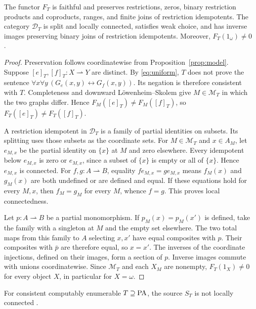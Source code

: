 \begin{theorem}\label{thm:faithful}
The functor $F_T$ is faithful and preserves restrictions, zeros, binary
restriction products and coproducts, ranges, and finite joins of
restriction idempotents. The category
$\mathcal D_T$ is split and locally connected, satisfies weak choice,
and has inverse images preserving binary joins of restriction
idempotents. Moreover,
$F_T(1_\omega)\ne0$.
\end{theorem}
\begin{proof}
Preservation follows coordinatewise from Proposition~\ref{prop:model}.
Suppose $[e]_T,[f]_T:X\rightharpoonup Y$ are distinct. By
\eqref{eq:uniform}, $T$ does not prove the sentence
$\forall x\forall y\,(G_e(x,y)\leftrightarrow G_f(x,y))$.
Its negation is therefore consistent with $T$.
Completeness and downward L\"owenheim--Skolem give
$M\in\mathcal M_T$ in which the two graphs differ. Hence
$F_M([e]_T)\ne F_M([f]_T)$, so $F_T([e]_T)\ne F_T([f]_T)$.

A restriction idempotent in $\mathcal D_T$ is a family of partial
identities on subsets. Its splitting uses those subsets as the
coordinate sets. For $M\in\mathcal M_T$ and $x\in A_M$, let $e_{M,x}$ be the
partial identity on $\{x\}$ at $M$ and zero elsewhere.
Every idempotent below $e_{M,x}$ is zero or $e_{M,x}$, since a subset
of $\{x\}$ is empty or all of $\{x\}$. Hence $e_{M,x}$ is connected.
For $f,g:A\rightharpoonup B$, equality
$fe_{M,x}=ge_{M,x}$ means $f_M(x)$ and $g_M(x)$ are both undefined
or are defined and equal. If these equations hold for every $M,x$,
then $f_M=g_M$ for every $M$, whence $f=g$.
This proves local connectedness.

Let $p:A\rightharpoonup B$ be a partial monomorphism. If
$p_M(x)=p_M(x')$ is defined, take the family with a singleton at $M$
and the empty set elsewhere. The two total maps from this family to $A$
selecting $x,x'$ have equal composites with $p$. Their composites with
$\bar p$ are therefore equal, so $x=x'$. The inverses of the coordinate
injections, defined on their images, form a section of $p$.
Inverse images commute with unions coordinatewise. Since
$\mathcal M_T$ and each $X_M$ are nonempty, $F_T(1_X)\ne0$ for
every object $X$, in particular for $X=\omega$.
\end{proof}

For consistent computably enumerable $T\supseteq\mathrm{PA}$, the source $S_T$
is not locally connected \cite[Corollary 4.4, pp.~657--658]{DPM}.

